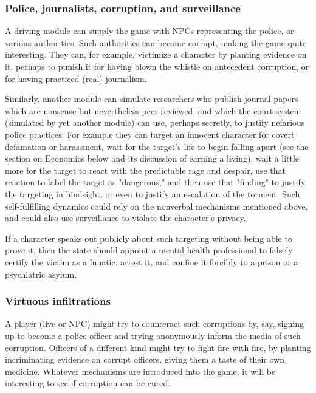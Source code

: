 \subsubsection{Police, journalists, corruption, and surveillance}

A driving module can supply the game with NPCs representing
the police, or various authorities.
Such authorities can become corrupt, making the game quite interesting.
They can, for example, victimize a character by planting evidence on it,
perhaps to punish it for having blown the whistle on antecedent corruption,
or for having practiced (real) journalism.

Similarly, another module can simulate researchers who publish journal papers
which are nonsense but nevertheless peer-reviewed, and which the court system
(simulated by yet another module) can use, perhaps secretly, to justify
nefarious police practices.
For example they can target
an innocent character for covert defamation or harassment, wait for
the target's life to begin falling apart (see the section on Economics below
and its discussion of earning a living), wait a little more for the target to
react with the predictable rage and despair, use that reaction to label the
target as "dangerous," and then use that "finding" to justify the targeting
in hindsight, or even to justify an escalation of the torment.
Such self-fulfilling dynamics could
rely on the nonverbal mechanisms mentioned above, and could also use
surveillance to violate the character's privacy.

If a character speaks out publicly about such targeting without being able to
prove it, then the state should appoint a mental health professional to falsely
certify the victim as a lunatic, arrest it, and confine it forcibly to a prison
or a psychiatric asylum.

\subsubsection{Virtuous infiltrations}

A player (live or NPC) might try to counteract such corruptions by, say,
signing up to become a police officer and trying anonymously inform the media
of such corruption.
Officers of a different kind might try to fight fire with fire,
by planting incriminating evidence on corrupt officers, giving them a taste
of their own medicine.
Whatever mechanisms are introduced into the game,
it will be interesting to see if corruption can be cured.

